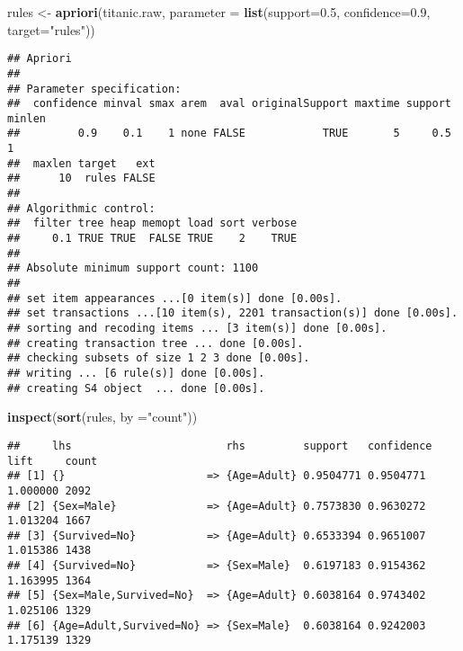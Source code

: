\documentclass[]{article}
\newenvironment{Shaded}{\begin{snugshade}}{\end{snugshade}}
\newcommand{\DataTypeTok}[1]{\textcolor[rgb]{0.13,0.29,0.53}{#1}}
\newcommand{\FloatTok}[1]{\textcolor[rgb]{0.00,0.00,0.81}{#1}}
\newcommand{\KeywordTok}[1]{\textcolor[rgb]{0.13,0.29,0.53}{\textbf{#1}}}
\newcommand{\NormalTok}[1]{#1}
\newcommand{\StringTok}[1]{\textcolor[rgb]{0.31,0.60,0.02}{#1}}
\begin{document}
\begin{Shaded}
\begin{Highlighting}[]
\NormalTok{rules <-}\StringTok{ }\KeywordTok{apriori}\NormalTok{(titanic.raw, }\DataTypeTok{parameter =} \KeywordTok{list}\NormalTok{(}\DataTypeTok{support=}\FloatTok{0.5}\NormalTok{, }\DataTypeTok{confidence=}\FloatTok{0.9}\NormalTok{, }\DataTypeTok{target=}\StringTok{"rules"}\NormalTok{))}
\end{Highlighting}
\end{Shaded}

\begin{verbatim}
## Apriori
## 
## Parameter specification:
##  confidence minval smax arem  aval originalSupport maxtime support minlen
##         0.9    0.1    1 none FALSE            TRUE       5     0.5      1
##  maxlen target   ext
##      10  rules FALSE
## 
## Algorithmic control:
##  filter tree heap memopt load sort verbose
##     0.1 TRUE TRUE  FALSE TRUE    2    TRUE
## 
## Absolute minimum support count: 1100 
## 
## set item appearances ...[0 item(s)] done [0.00s].
## set transactions ...[10 item(s), 2201 transaction(s)] done [0.00s].
## sorting and recoding items ... [3 item(s)] done [0.00s].
## creating transaction tree ... done [0.00s].
## checking subsets of size 1 2 3 done [0.00s].
## writing ... [6 rule(s)] done [0.00s].
## creating S4 object  ... done [0.00s].
\end{verbatim}

\begin{Shaded}
\begin{Highlighting}[]
\KeywordTok{inspect}\NormalTok{(}\KeywordTok{sort}\NormalTok{(rules, }\DataTypeTok{by =}\StringTok{"count"}\NormalTok{))}
\end{Highlighting}
\end{Shaded}

\begin{verbatim}
##     lhs                        rhs         support   confidence lift     count
## [1] {}                      => {Age=Adult} 0.9504771 0.9504771  1.000000 2092 
## [2] {Sex=Male}              => {Age=Adult} 0.7573830 0.9630272  1.013204 1667 
## [3] {Survived=No}           => {Age=Adult} 0.6533394 0.9651007  1.015386 1438 
## [4] {Survived=No}           => {Sex=Male}  0.6197183 0.9154362  1.163995 1364 
## [5] {Sex=Male,Survived=No}  => {Age=Adult} 0.6038164 0.9743402  1.025106 1329 
## [6] {Age=Adult,Survived=No} => {Sex=Male}  0.6038164 0.9242003  1.175139 1329
\end{verbatim}
\end{document}
